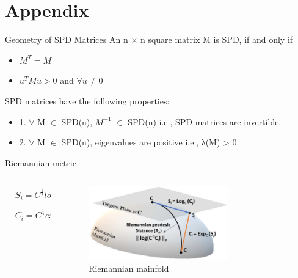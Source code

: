 \documentclass[10pt]{beamer}
\begin{document}
\section{Appendix}
\begin{frame}{Geometry of SPD Matrices}
An n $\times$ n square matrix M is SPD, if and only if
\begin{itemize}
    \item $M^T = M$
    \item $u^TMu>0$ and $\forall u \neq 0$
\end{itemize}
SPD matrices have the following properties:
\begin{itemize}
\item 1. $\forall$ M $\in$ SPD(n), $M^{-1}$ $\in$ SPD(n) i.e., SPD matrices are invertible. 
\item 2. $\forall$ M $\in$ SPD(n), eigenvalues are positive i.e., λ(M) > 0.
\end{itemize}
\end{frame}
\begin{frame}{Riemannian metric}
    \begin{columns}
        \begin{column}{0.5\textwidth}
          \begin{equation} \nonumber
          \begin{aligned}
          &S_i = C^{\frac{1}{2}}logm(C^{-\frac{1}{2}}C_iC^{-\frac{1}{2}})C^{\frac{1}{2}} \\
          &C_i = C^{\frac{1}{2}}expm(C^{-\frac{1}{2}}S_iC^{-\frac{1}{2}})C^{\frac{1}{2}} \\
          \end{aligned}
           \end{equation}
        \end{column}
        \begin{column}{0.5\textwidth}  %
            \begin{figure}[!htb] 
                \centering 
               \includegraphics[width=0.7\textwidth]{RieDis.png}
               \caption{\href{https://www.mdpi.com/1424-8220/19/2/379}{Riemannian mainfold}} 
            \end{figure}
        \end{column}
    \end{columns}
\end{frame}
\end{document}
